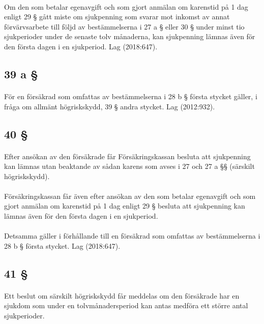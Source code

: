 \documentclass[a4paper,notitlepage,openany,10pt]{book}
\begin{document}
\paragraph*{}
Om den som betalar egenavgift och som gjort anmälan om karenstid på 1 dag enligt 29 § gått miste om sjukpenning som svarar mot inkomst av annat förvärvsarbete till följd av bestämmelserna i 27 a § eller 30 § under minst tio sjukperioder under de senaste tolv månaderna, kan sjukpenning lämnas även för den första dagen i en sjukperiod.
Lag (2018:647).
\subsection*{39 a §}
\paragraph*{}
För en försäkrad som omfattas av bestämmelserna i 28 b § första stycket gäller, i fråga om allmänt högriskskydd, 39 § andra stycket.
Lag (2012:932).
\subsection*{40 §}
\paragraph*{}
Efter ansökan av den försäkrade får Försäkringskassan besluta att sjukpenning kan lämnas utan beaktande av sådan karens som avses i 27 och 27 a §§ (särskilt högriskskydd).
\paragraph*{}
Försäkringskassan får även efter ansökan av den som betalar egenavgift och som gjort anmälan om karenstid på 1 dag enligt 29 § besluta att sjukpenning kan lämnas även för den första dagen i en sjukperiod.
\paragraph*{}
Detsamma gäller i förhållande till en försäkrad som omfattas av bestämmelserna i 28 b § första stycket.
Lag (2018:647).
\subsection*{41 §}
\paragraph*{}
Ett beslut om särskilt högriskskydd får meddelas om den försäkrade har en sjukdom som under en tolvmånadersperiod kan antas medföra ett större antal sjukperioder.
\end{document}
